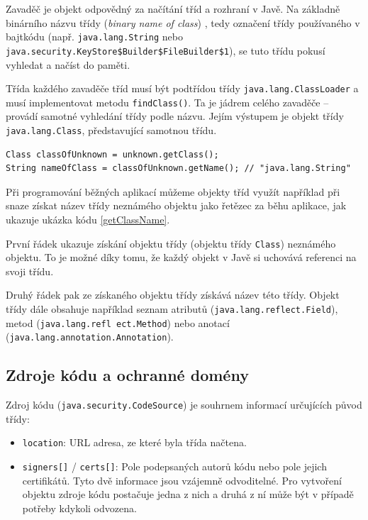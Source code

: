 Zavaděč je objekt odpovědný za načítání tříd a rozhraní v Javě. Na základně binárního názvu třídy ({\it binary name of class}) \cite{binaryNameOfClass}, tedy označení třídy používaného v bajtkódu (např. {\tt java.lang.String} nebo {\tt java.security.KeyStore\$Builder\$FileBuilder\$1}), se tuto třídu pokusí vyhledat a načíst do paměti. \cite{refClassLoader}

Třída každého zavaděče tříd musí být podtřídou třídy {\tt java.lang.ClassLoader} a musí implementovat metodu {\tt findClass()}. Ta je jádrem celého zavaděče -- provádí samotné vyhledání třídy podle názvu. Jejím výstupem je objekt třídy {\tt java.lang.Class}, představující samotnou třídu. \cite{refClassLoader}

\begin{lstlisting}[caption=Získávání názvu třídy neznámého objektu, label=getClassName]
Class classOfUnknown = unknown.getClass();
String nameOfClass = classOfUnknown.getName(); // "java.lang.String"
\end{lstlisting}

Při programování běžných aplikací můžeme objekty tříd využít například při snaze získat název třídy neznámého objektu jako řetězec za běhu aplikace,
jak ukazuje ukázka kódu \ref{getClassName}.

První řádek ukazuje získání objektu třídy (objektu třídy {\tt Class}) neznámého objektu.
To je možné díky tomu, že každý objekt v Javě si uchovává referenci na svoji třídu.

Druhý řádek pak ze získaného objektu třídy získává název této třídy.
Objekt třídy dále obsahuje například seznam atributů ({\tt java.lang.reflect.Field}), metod ({\tt java.lang.refl ect.Method})
nebo anotací ({\tt java.lang.annotation.Annotation}). \cite{sourceClass}

\subsection{Zdroje kódu a ochranné domény} \label{codeSourceAprotectionDomains}

Zdroj kódu ({\tt java.security.CodeSource}) je souhrnem informací určujících původ třídy:~\cite{sourceCodeSource}

\begin{itemize}
  \item {\tt location}: URL adresa, ze které byla třída načtena.
  \item {\tt signers[]} / {\tt certs[]}: Pole podepsaných autorů kódu nebo pole jejich certifikátů. Tyto dvě informace jsou vzájemně odvoditelné. Pro vytvoření objektu zdroje kódu postačuje jedna z nich a druhá z ní může být v případě potřeby kdykoli odvozena.
\end{itemize}


